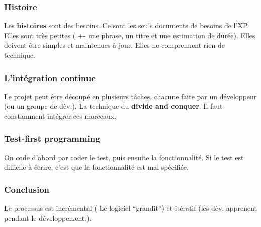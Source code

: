 \subsubsection{Histoire}
Les \textbf{histoires} sont des besoins. Ce sont les seuls documents de besoins de l’XP. Elles sont très petites ( +- une phrase, un titre et une estimation de durée). Elles doivent être simples et maintenues à jour.
Elles ne comprennent rien de technique.



\subsubsection{L’intégration continue}
Le projet peut être découpé en plusieurs tâches, chacune faite par un développeur (ou un groupe de dèv.). La technique du \textbf{divide and conquer}. Il faut constamment intégrer ces morceaux.



\subsubsection{Test-first programming}
On code d’abord par coder le test, puis ensuite la fonctionnalité. Si le test est difficile à écrire, c’est que la fonctionnalité est mal spécifiée.



\subsubsection{Conclusion}
Le processus est incrémental ( Le logiciel “grandit”) et itératif (les dèv. apprenent pendant le développement.).